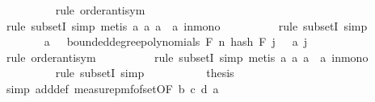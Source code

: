 \begin{isabellebody}
\ \ \ \ \ \ \ \ \isamarkupfalse%
\ {\isacharparenleft}{\kern0pt}rule\ order{\isacharunderscore}{\kern0pt}antisym{\isacharparenright}{\kern0pt}\isanewline
\ \ \ \ \ \ \ \ \isamarkupfalse%
\ {\isacharparenleft}{\kern0pt}rule\ subsetI{\isacharcomma}{\kern0pt}\ simp{\isacharcomma}{\kern0pt}\ metis\ a{\isacharunderscore}{\kern0pt}{}\ a{\isacharunderscore}{\kern0pt}{}\ a{\isacharunderscore}{\kern0pt}{}\ \ a{\isacharunderscore}{\kern0pt}{}\ in{\isacharunderscore}{\kern0pt}mono{\isacharparenright}{\kern0pt}\isanewline
\ \ \ \ \ \ \ \ \isamarkupfalse%
\ {\isacharparenleft}{\kern0pt}rule\ subsetI{\isacharcomma}{\kern0pt}\ simp{\isacharparenright}{\kern0pt}\ \isanewline
\ \ \ \ \ \ \isamarkupfalse%
\ a{\isacharunderscore}{\kern0pt}{}{}{\isacharcolon}{\kern0pt}\ {\isachardoublequoteopen}{\isacharbraceleft}{\kern0pt}{\isasymomega}\ {\isasymin}\ bounded{\isacharunderscore}{\kern0pt}degree{\isacharunderscore}{\kern0pt}polynomials\ F\ n{\isachardot}{\kern0pt}\ hash\ F\ j\ {\isasymomega}\ {\isacharequal}{\kern0pt}\ a\ j{\isacharbraceright}{\kern0pt}\ {\isacharequal}{\kern0pt}\ {\isacharbraceleft}{\kern0pt}{\isacharbraceright}{\kern0pt}{\isachardoublequoteclose}\isanewline
\ \ \ \ \ \ \ \ \isamarkupfalse%
\ {\isacharparenleft}{\kern0pt}rule\ order{\isacharunderscore}{\kern0pt}antisym{\isacharparenright}{\kern0pt}\isanewline
\ \ \ \ \ \ \ \ \isamarkupfalse%
\ {\isacharparenleft}{\kern0pt}rule\ subsetI{\isacharcomma}{\kern0pt}\ simp{\isacharcomma}{\kern0pt}\ metis\ a{\isacharunderscore}{\kern0pt}{}\ a{\isacharunderscore}{\kern0pt}{}\ a{\isacharunderscore}{\kern0pt}{}\ \ a{\isacharunderscore}{\kern0pt}{}\ in{\isacharunderscore}{\kern0pt}mono{\isacharparenright}{\kern0pt}\isanewline
\ \ \ \ \ \ \ \ \isamarkupfalse%
\ {\isacharparenleft}{\kern0pt}rule\ subsetI{\isacharcomma}{\kern0pt}\ simp{\isacharparenright}{\kern0pt}\ \isanewline
\ \ \ \ \ \ \isamarkupfalse%
\ \isamarkupfalse%
\ {\isacharquery}{\kern0pt}thesis\isanewline
\ \ \ \ \ \ \ \ \isamarkupfalse%
\ {\isacharparenleft}{\kern0pt}simp\ add{\isacharcolon}{\kern0pt}{\isasymOmega}{\isacharunderscore}{\kern0pt}def\ measure{\isacharunderscore}{\kern0pt}pmf{\isacharunderscore}{\kern0pt}of{\isacharunderscore}{\kern0pt}set{\isacharbrackleft}{\kern0pt}OF\ b\ c{\isacharbrackright}{\kern0pt}\ d\ a{\isacharunderscore}{\kern0pt}{}{}{\isacharparenright}{\kern0pt}\isanewline

\end{isabellebody}
